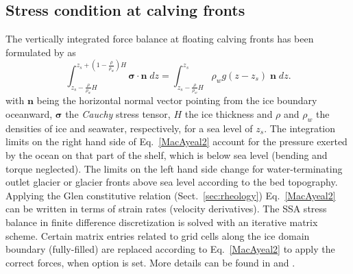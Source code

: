 \subsection{Stress condition at calving fronts}
\label{sec:cfbc}
The vertically integrated force balance at floating calving fronts has been formulated by \cite{Morland} as
\begin{equation}
\int_{z_s-\frac{\rho}{\rho_w}H}^{z_s+(1-\frac{\rho}{\rho_w})H}\mathbf{\sigma}\cdot\mathbf{n}\;dz = \int_{z_s-\frac{\rho}{\rho_w}H}^{z_s}\rho_w g (z-z_s) \;\mathbf{n}\;dz.
\label{MacAyeal2}
\end{equation}
with $\mathbf{n}$ being the horizontal normal vector pointing from the ice boundary oceanward, $\mathbf{\sigma}$ the \emph{Cauchy} stress tensor, $H$ the ice thickness and $\rho$ and $\rho_{w}$ the densities of ice and seawater, respectively, for a sea level of $z_s$. The integration limits on the right hand side of Eq.~\eqref{MacAyeal2} account for the pressure exerted by the ocean on that part of the shelf, which is below sea level (bending and torque neglected). The limits on the left hand side change for water-terminating outlet glacier or glacier fronts above sea level according to the bed topography. Applying the Glen constitutive relation (Sect.~\ref{sec:rheology}) Eq.~\eqref{MacAyeal2} can be written in terms of strain rates (velocity derivatives). The SSA stress balance in finite difference discretization is solved with an iterative matrix scheme. Certain matrix entries related to grid cells along the ice domain boundary (fully-filled) are replaced according to Eq.~\eqref{MacAyeal2} to apply the correct forces, when option  is set. More details can be found in \cite{Winkelmannetal2010TCD} and \cite{Albrechtetal2011}.  

